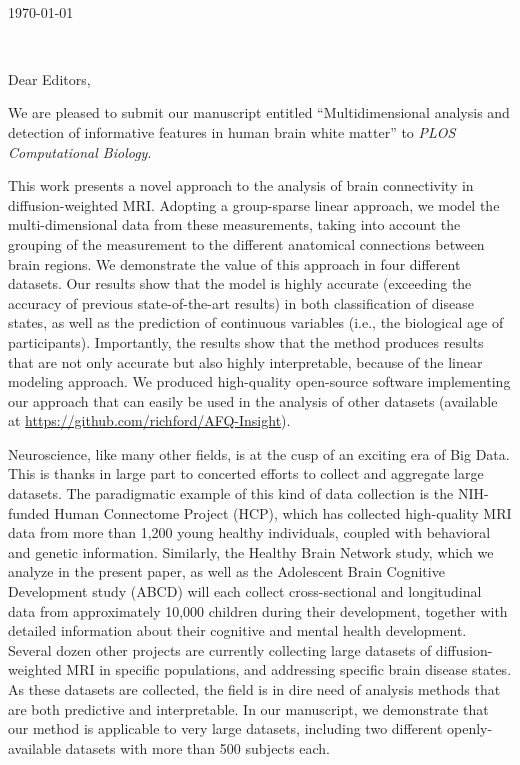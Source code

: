 \documentclass[11pt,letterpaper]{letter} %
\def\opening#1{\thispagestyle{empty}
{\centering\fromaddress \vspace{1.2in} \\ %
\hspace*{\longindentation}\today\par} %
{\raggedright \toname \\ \toaddress \par} %
\vspace{0.2in} %
\noindent #1 %
}
\begin{document}
\begin{letter}{}
\opening{Dear Editors,}

We are pleased to submit our manuscript entitled ``Multidimensional analysis
and detection of informative features in human brain white matter'' to
\emph{PLOS Computational Biology}.

This work presents a novel approach to the analysis of brain connectivity in
diffusion-weighted MRI. Adopting a group-sparse linear approach, we model the
multi-dimensional data from these measurements, taking into account the
grouping of the measurement to the different anatomical connections between
brain regions. We demonstrate the value of this approach in four different
datasets. Our results show that the model is highly accurate (exceeding the
accuracy of previous state-of-the-art results) in both classification of
disease states, as well as the prediction of continuous variables (i.e., the
biological age of participants). Importantly, the results show that the
method produces results that are not only accurate but also highly
interpretable, because of the linear modeling approach. We produced
high-quality open-source software implementing our approach that can easily
be used in the analysis of other datasets (available at \url{https://github.com/richford/AFQ-Insight}).

Neuroscience, like many other fields, is at the cusp of an exciting era of
Big Data. This is thanks in large part to concerted efforts to collect and
aggregate large datasets. The paradigmatic example of this kind of data
collection is the NIH-funded Human Connectome Project (HCP), which has
collected high-quality MRI data from more than 1,200 young healthy
individuals, coupled with behavioral and genetic information. Similarly, the
Healthy Brain Network study, which we analyze in the present paper, as well
as the Adolescent Brain Cognitive Development study (ABCD) will each collect
cross-sectional and longitudinal data from approximately 10,000 children
during their development, together with detailed information about their
cognitive and mental health development. Several dozen other projects are
currently collecting large datasets of diffusion-weighted MRI in specific
populations, and addressing specific brain disease states. As these datasets
are collected, the field is in dire need of analysis methods that are both
predictive and interpretable. In our manuscript, we demonstrate that our
method is applicable to very large datasets, including two different
openly-available datasets with more than 500 subjects each.


\end{letter}
\end{document}
